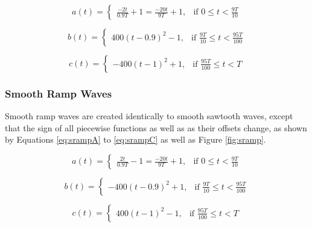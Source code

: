   \begin{equation}
    a(t) =
    \begin{cases}
      \frac{-2t}{0.9T} + 1 = \frac{-20t}{9T} + 1,& \text{if } 0 \leq t < \frac{9T}{10}
    \end{cases}
    \label{eq:ssawA}
  \end{equation}

  \begin{equation}
    b(t) =
    \begin{cases}
      400(t-0.9)^2 - 1,& \text{if } \frac{9T}{10} \leq t < \frac{95T}{100}
    \end{cases}
    \label{eq:ssawB}
  \end{equation}

  \begin{equation}
    c(t) =
    \begin{cases}
      -400(t-1)^2 + 1,& \text{if } \frac{95T}{100} \leq t < T
    \end{cases}
    \label{eq:ssawC}
  \end{equation}

  \subsubsection{Smooth Ramp Waves}

  Smooth ramp waves are created identically to smooth sawtooth waves, except that the sign of all piecewise functions as well as as their offsets change, as shown by Equations \ref{eq:srampA} to \ref{eq:srampC} as well as Figure \ref{fig:sramp}.

  \begin{equation}
    a(t) =
    \begin{cases}
      \frac{2t}{0.9T} - 1 = \frac{-20t}{9T} + 1,& \text{if } 0 \leq t < \frac{9T}{10}
    \end{cases}
    \label{eq:srampA}
  \end{equation}

  \begin{equation}
    b(t) =
    \begin{cases}
      -400(t-0.9)^2 + 1,& \text{if } \frac{9T}{10} \leq t < \frac{95T}{100}
    \end{cases}
    \label{eq:srampB}
  \end{equation}

  \begin{equation}
    c(t) =
    \begin{cases}
      400(t-1)^2 - 1,& \text{if } \frac{95T}{100} \leq t < T
    \end{cases}
    \label{eq:srampC}
  \end{equation}

